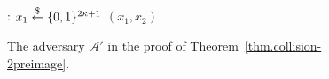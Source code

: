 \begin{figure}[t]
  \begin{algorithm}[H]
    \caption{\label{alg.collision-2preimage}
            The adversary $\mathcal{A}'$ in the
            proof of Theorem~\ref{thm.collision-2preimage}.}
    \begin{algorithmic}[1]
      :
          \State $x_1 \overset{\$}{\gets} \{0,1\}^{2\kappa+1}$
          \State \Return $(x_1, x_2)$
      \EndFunction
    \end{algorithmic}
  \end{algorithm}
\end{figure}
